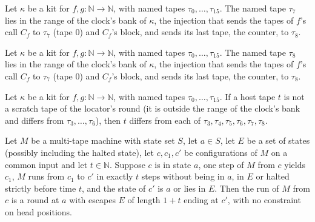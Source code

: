 \begin{theorem}
\label{Turing.NTimeDiag.qy_tp7_mem}
\leanok
{}
Let $\kappa$ be a kit for $f, g : \mathbb{N} \to \mathbb{N}$, with named tapes $\tau_0, \dots,
\tau_{15}$. The named tape $\tau_7$ lies in the range of the clock's bank of $\kappa$, the
injection that sends the tapes of $f$'s call $C_f$ to $\tau_7$ (tape $0$) and $C_f$'s block, and
sends its last tape, the counter, to $\tau_8$.
\end{theorem}

\begin{theorem}
\label{Turing.NTimeDiag.qy_tp8_mem}
\leanok
{}
Let $\kappa$ be a kit for $f, g : \mathbb{N} \to \mathbb{N}$, with named tapes $\tau_0, \dots,
\tau_{15}$. The named tape $\tau_8$ lies in the range of the clock's bank of $\kappa$, the
injection that sends the tapes of $f$'s call $C_f$ to $\tau_7$ (tape $0$) and $C_f$'s block, and
sends its last tape, the counter, to $\tau_8$.
\end{theorem}

\begin{theorem}
\label{Turing.NTimeDiag.qy_not_scratch}
\leanok
{}
Let $\kappa$ be a kit for $f, g : \mathbb{N} \to \mathbb{N}$, with named tapes $\tau_0, \dots,
\tau_{15}$. If a host tape $t$ is not a scratch tape of the locator's round (it is outside the
range of the clock's bank and differs from $\tau_3, \dots, \tau_6$), then $t$ differs from each of
$\tau_3, \tau_4, \tau_5, \tau_6, \tau_7, \tau_8$.
\end{theorem}

\begin{theorem}
\label{Turing.NTimeDiag.qy_round_of_seg}
\leanok
{}
Let $M$ be a multi-tape machine with state set $S$, let $a \in S$, let $E$ be a set of states
(possibly including the halted state), let $c, c_1, c'$ be configurations of $M$ on a common input
and let $t \in \mathbb{N}$. Suppose $c$ is in state $a$, one step of $M$ from $c$ yields $c_1$, $M$
runs from $c_1$ to $c'$ in exactly $t$ steps without being in $a$, in $E$ or halted strictly before
time $t$, and the state of $c'$ is $a$ or lies in $E$. Then the run of $M$ from $c$ is a round at
$a$ with escapes $E$ of length $1 + t$ ending at $c'$, with no constraint on head positions.
\end{theorem}

